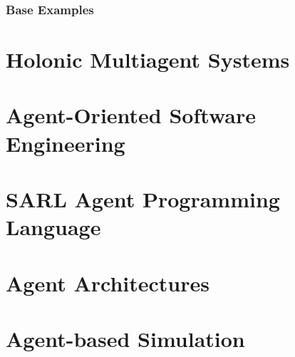 \begin{bibliographysection}
\section{Base Examples}
\localized
\localized

\part{Holonic Multiagent Systems}

\localized
\localized
\localized
\localized

\part{Agent-Oriented Software Engineering}

\localized

\part{SARL Agent Programming Language}

\localized
\localized
\localized
\localized
\localized
\localized
\localized
\localized
\localized
\localized

\part{Agent Architectures}

\localized
\localized
\localized
\localized
\localized

\part{Agent-based Simulation}


\end{bibliographysection}
